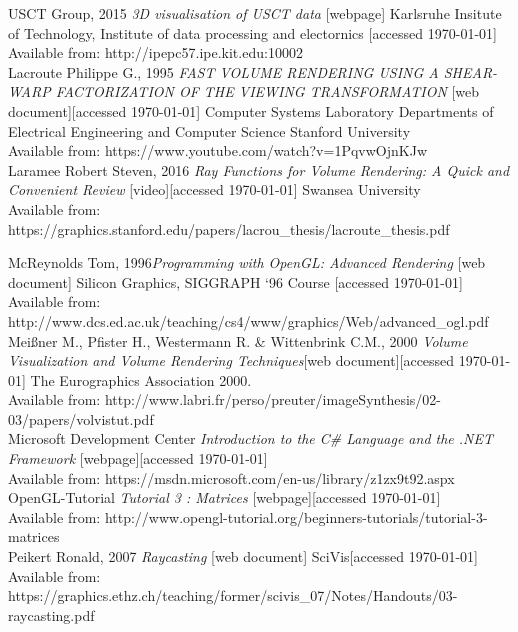 \documentclass[twoside, english, 11pt]{report}
\begin{document}
\small USCT Group, 2015 \textit{3D visualisation of USCT data} [webpage] Karlsruhe Insitute of Technology, Institute of data processing and electornics [accessed \today] \\
Available from: http://ipepc57.ipe.kit.edu:10002\\

\small Lacroute Philippe G., 1995 \textit{FAST VOLUME RENDERING USING A SHEAR-WARP FACTORIZATION OF THE VIEWING TRANSFORMATION} [web document][accessed \today] Computer Systems Laboratory
Departments of Electrical Engineering and Computer Science Stanford University \\
Available from: https://www.youtube.com/watch?v=1PqvwOjnKJw\\

\small Laramee Robert Steven, 2016 \textit{Ray Functions for Volume Rendering: A Quick and Convenient Review} [video][accessed \today] Swansea University \\
Available from: https://graphics.stanford.edu/papers/lacrou\_thesis/lacroute\_thesis.pdf\

\small McReynolds Tom, 1996\textit{Programming with OpenGL: Advanced Rendering} [web document] Silicon Graphics, SIGGRAPH ‘96 Course [accessed \today] \\
Available from: http://www.dcs.ed.ac.uk/teaching/cs4/www/graphics/Web/advanced\_ogl.pdf\\

\small Meißner M., Pfister H., Westermann R. \& Wittenbrink C.M., 2000 \textit{Volume Visualization and Volume Rendering Techniques}[web document][accessed \today] The Eurographics Association 2000.\\
Available from: http://www.labri.fr/perso/preuter/imageSynthesis/02-03/papers/volvistut.pdf\\

\small Microsoft Development Center \textit{Introduction to the C\# Language and the .NET Framework} [webpage][accessed \today] \\
Available from: https://msdn.microsoft.com/en-us/library/z1zx9t92.aspx\\

\small OpenGL-Tutorial \textit{Tutorial 3 : Matrices} [webpage][accessed \today] \\
Available from: http://www.opengl-tutorial.org/beginners-tutorials/tutorial-3-matrices\\

\small Peikert Ronald, 2007 \textit{Raycasting} [web document] SciVis[accessed \today] \\
Available from: https://graphics.ethz.ch/teaching/former/scivis\_07/Notes/Handouts/03-raycasting.pdf\\
\end{document}

